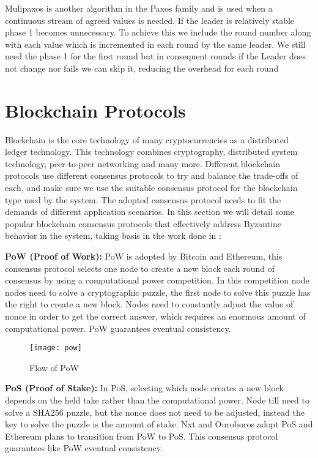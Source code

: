 Mulipaxos is another algorithm in the Paxos family and is used when a
continuous stream of agreed values is needed.
If the leader is relatively stable phase 1 becomes unnecessary. To achieve this
we include the round number along with each value which is incremented in each round
by the same leader. We still need the phase 1 for the first round but in
consequent rounds if the Leader does not change nor fails we can skip it, reducing
the overhead for each round

\section{Blockchain Protocols}
\label{sec:blockchain}

Blockchain is the core technology of many cryptocurrencies as a distributed
ledger technology. This technology combines cryptography, distributed system
technology, peer-to-peer networking and many more. Different blockchain
protocols use different consensus protocols to try and balance the trade-offs of
each, and make sure we use the suitable consensus protocol for the blockchain type
used by the system. The adopted consensus protocol needs to fit the demands of
different application scenarios. In this section we will detail some popular
blockchain consensus protocols that effectively address Byzantine behavior
in the system, taking basis in the work done in \cite{blockchain_consensus}:

\textbf{PoW (Proof of Work):} PoW is adopted by Bitcoin and Ethereum,
this consensus protocol selects one node to create a new block 
each round of consensus by using a computational power competition. In this
competition node nodes need to solve a cryptographic puzzle, the first node to solve
this puzzle has the right to create a new block. Nodes need to constantly adjust the
value of nonce in order to get the correct answer, which requires an enormous amount
of computational power. PoW guarantees eventual consistency.

\begin{figure}[h]
	\centering
	\texttt{[image: pow]}
	\caption{Flow of PoW}
	\label{fig:pow}
\end{figure}

\textbf{PoS (Proof of Stake):} In PoS, selecting which node creates a new block
depends on the held take rather than the computational power. Node till need to solve
a SHA256 puzzle, but the nonce does not need to be adjusted, instead the key to solve
the puzzle is the amount of stake. Nxt and Ouroboros adopt PoS and Ethereum plans to
transition from PoW to PoS. This consensus protocol guarantees like
PoW eventual consistency. 

